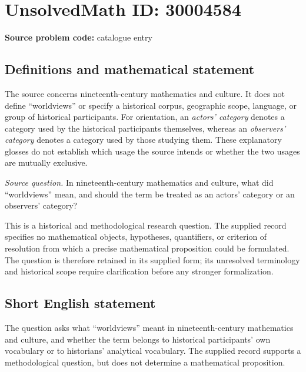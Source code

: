 \documentclass[11pt]{article}
\begin{document}
\section*{UnsolvedMath ID: 30004584}
\textbf{Source problem code:} catalogue entry
\subsection{Definitions and mathematical statement}
The source concerns nineteenth-century mathematics and culture. It does not define ``worldviews'' or specify a historical corpus, geographic scope, language, or group of historical participants. For orientation, an \emph{actors' category} denotes a category used by the historical participants themselves, whereas an \emph{observers' category} denotes a category used by those studying them. These explanatory glosses do not establish which usage the source intends or whether the two usages are mutually exclusive.

\emph{Source question.} In nineteenth-century mathematics and culture, what did ``worldviews'' mean, and should the term be treated as an actors' category or an observers' category?

This is a historical and methodological research question. The supplied record specifies no mathematical objects, hypotheses, quantifiers, or criterion of resolution from which a precise mathematical proposition could be formulated. The question is therefore retained in its supplied form; its unresolved terminology and historical scope require clarification before any stronger formalization.
\subsection{Short English statement}
The question asks what ``worldviews'' meant in nineteenth-century mathematics and culture, and whether the term belongs to historical participants' own vocabulary or to historians' analytical vocabulary. The supplied record supports a methodological question, but does not determine a mathematical proposition.
\end{document}
